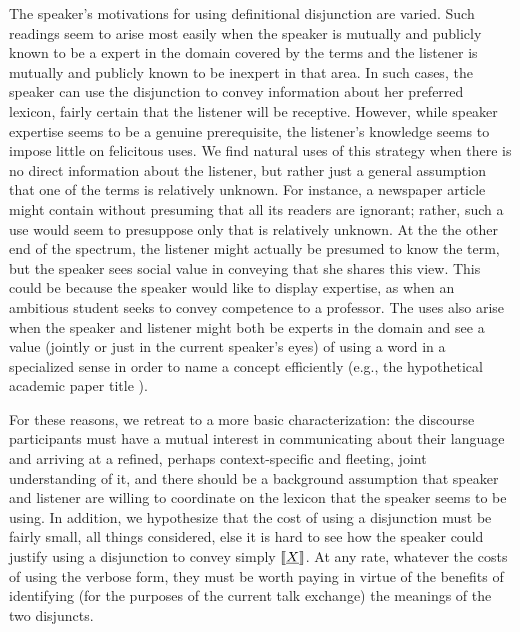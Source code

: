 \documentclass{article}
\begin{document}
The speaker's motivations for using definitional disjunction are
varied. Such readings seem to arise most easily when the speaker is
mutually and publicly known to be a expert in the domain covered by
the terms and the listener is mutually and publicly known to be
inexpert in that area. In such cases, the speaker can use the
disjunction to convey information about her preferred lexicon, fairly
certain that the listener will be receptive. However, while speaker
expertise seems to be a genuine prerequisite, the listener's knowledge
seems to impose little on felicitous uses. We find natural uses of
this strategy when there is no direct information about the listener,
but rather just a general assumption that one of the terms is
relatively unknown. For instance, a newspaper article might contain
 without presuming that all its readers
are ignorant; rather, such a use would seem to presuppose only that
 is relatively unknown. At the the other end of the
spectrum, the listener might actually be presumed to know the term,
but the speaker sees social value in conveying that she shares this
view. This could be because the speaker would like to display
expertise, as when an ambitious student seeks to convey competence to
a professor. The uses also arise when the speaker and listener might
both be experts in the domain and see a value (jointly or just in the
current speaker's eyes) of using a word in a specialized sense in
order to name a concept efficiently (e.g., the hypothetical academic
paper title ).

For these reasons, we retreat to a more basic characterization: the
discourse participants must have a mutual interest in communicating
about their language and arriving at a refined, perhaps
context-specific and fleeting, joint understanding of it, and there
should be a background assumption that speaker and listener are
willing to coordinate on the lexicon that the speaker seems to be
using. In addition, we hypothesize that the cost of using a
disjunction must be fairly small, all things considered, else it is
hard to see how the speaker could justify using a disjunction  to convey simply $\llbracket\emph{X}\rrbracket$. At any rate, whatever the
costs of using the verbose form, they must be worth paying in virtue
of the benefits of identifying (for the purposes of the current talk
exchange) the meanings of the two disjuncts.

\end{document}
